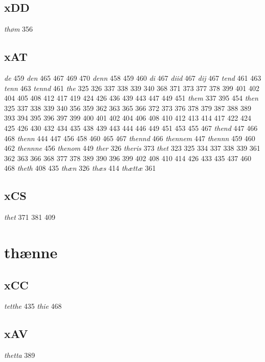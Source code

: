 \documentclass[a4paper,twocolumn]{article}
\begin{document}
\subsection{xDD}
\label{sec:orgf6d2eaf}
\emph{thøm} 356 
\subsection{xAT}
\label{sec:org52469b1}
\emph{de} 459 \emph{den} 465 467 469 470 \emph{denn} 458 459 460 \emph{di} 467 \emph{diid} 467 \emph{dij} 467 \emph{tend} 461 463 \emph{tenn} 463 \emph{tennd} 461 \emph{the} 325 326 337 338 339 340 368 371 373 377 378 399 401 402 404 405 408 412 417 419 424 426 436 439 443 447 449 451 \emph{them} 337 395 454 \emph{then} 325 337 338 339 340 356 359 362 363 365 366 372 373 376 378 379 387 388 389 393 394 395 396 397 399 400 401 402 404 406 408 410 412 413 414 417 422 424 425 426 430 432 434 435 438 439 443 444 446 449 451 453 455 467 \emph{thend} 447 466 468 \emph{thenn} 444 447 456 458 460 465 467 \emph{thennd} 466 \emph{thennem} 447 \emph{thennn} 459 460 462 \emph{thennne} 456 \emph{thenom} 449 \emph{ther} 326 \emph{theris} 373 \emph{thet} 323 325 334 337 338 339 361 362 363 366 368 377 378 389 390 396 399 402 408 410 414 426 433 435 437 460 468 \emph{theth} 408 435 \emph{thæn} 326 \emph{thæs} 414 \emph{thættæ} 361 
\subsection{xCS}
\label{sec:orgdd25ebf}
\emph{thet} 371 381 409 
\section{thænne}
\label{sec:org3b75228}
\subsection{xCC}
\label{sec:org5b5792b}
\emph{tetthe} 435 \emph{thie} 468 
\subsection{xAV}
\label{sec:org3940503}
\emph{thetta} 389 
\end{document}

